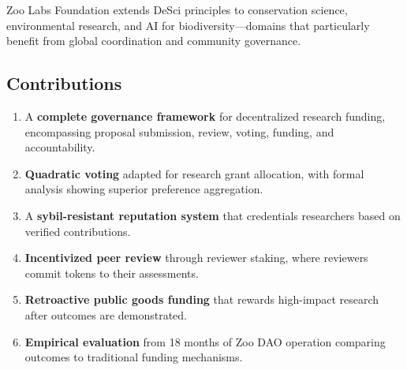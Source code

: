 Zoo Labs Foundation extends DeSci principles to conservation science,
environmental research, and AI for biodiversity---domains that
particularly benefit from global coordination and community governance.

\subsection{Contributions}

\begin{enumerate}
  \item A \textbf{complete governance framework} for decentralized
    research funding, encompassing proposal submission, review, voting,
    funding, and accountability.

  \item \textbf{Quadratic voting} adapted for research grant allocation,
    with formal analysis showing superior preference aggregation.

  \item A \textbf{sybil-resistant reputation system} that credentials
    researchers based on verified contributions.

  \item \textbf{Incentivized peer review} through reviewer staking,
    where reviewers commit tokens to their assessments.

  \item \textbf{Retroactive public goods funding} that rewards
    high-impact research after outcomes are demonstrated.

  \item \textbf{Empirical evaluation} from 18 months of Zoo DAO
    operation comparing outcomes to traditional funding mechanisms.
\end{enumerate}

